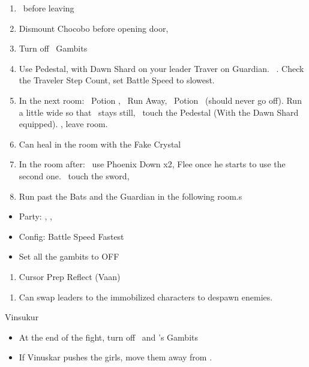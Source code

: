 \begin{enumerate}
	\item \save\ before leaving
	\item Dismount Chocobo before opening door, \leader{\basch}
	\item Turn off \basch\ Gambits
	\item Use Pedestal, with Dawn Shard on your leader
	\vaanf Traver on Guardian. \basch\ . Check the Traveler Step Count, set Battle Speed to slowest.
	\item In the next room: \vaan\ Potion \vaan, \basch\ Run Away, \vaan\ Potion \basch\ (should never go off). Run a little wide so that \vaan\ stays still, \basch\ touch the Pedestal (With the Dawn Shard equipped). \leader{\vaan}, leave room.
	\item Can heal in the room with the Fake Crystal
	\item In the room after: \basch\ use Phoenix Down x2, Flee once he starts to use the second one. \vaan\ touch the sword, \leader{\basch}
	\item Run past the Bats and the Guardian in the following room.s
\end{enumerate}
\begin{menu}
\begin{itemize}
\item Party: \vaan, \ashe, \penelo
\item Config: Battle Speed Fastest
\end{itemize}
\end{menu}
\begin{gambit}
\begin{itemize}

\vaanf \textbf{OFF}
\item Set all the gambits to OFF %
\end{itemize}
\end{gambit}
\begin{enumerate}
	\ashef Blizzara \penelo
	\penelof Immobilize \ashe
	\item Cursor	Prep Reflect (Vaan)
\end{enumerate}
\begin{enumerate}
	\item Can swap leaders to the immobilized characters to despawn enemies.
\end{enumerate}
\begin{battle}{Vinsukur}
	\begin{itemize}
		\vaanf Reflect \ashe, \penelo\ at the stairs, turn on their gambits
		\vaanf Flee to the corner and stay.
		\item At the end of the fight, turn off \ashe\ and \penelo's Gambits
		\item If Vinuskar pushes the girls, move them away from \vaan.
	\end{itemize}
\end{battle}
